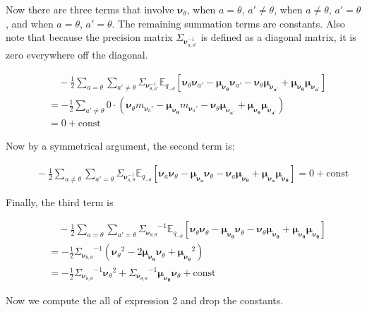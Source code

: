 \documentclass[letterpaper,12pt]{article}
\newcommand{\lp}{\left (} %
\newcommand{\rp}{\right )} %
\newcommand{\lb}{\left [} %
\newcommand{\rb}{\right ]} %
\newcommand{\nuv}{\boldsymbol{\nu}} %
\newcommand{\Sigmanu}{\Sigma_{\nuv}} %
\newcommand{\nua}{\ensuremath{\nuv_a}} %
\newcommand{\nuaprime}{\ensuremath{\nuv_{a'}}} %
\newcommand{\meananu}{\ensuremath{\boldsymbol{\mu_{\nuv_a}}}} %
\newcommand{\meanaprimenu}{\ensuremath{\boldsymbol{\mu_{\nuv_{a'}}}}} %
\newcommand{\nutheta}{\ensuremath{\nuv_\theta}} %
\newcommand{\meannutheta}{\ensuremath{\boldsymbol{\mu_{\nuv_\theta}}}} %
\newcommand{\sigmanutheta}{\ensuremath{\Sigma_{\nuv_{\theta, \theta}}}}
\newcommand{\mnusub}[1]{\ensuremath{m_{\nuv_#1}}} %
\newcommand{\Etheta}{\ensuremath{\mathbb{E}_{q_{-\theta}}}} %
\begin{document}
Now there are three terms that involve $\nutheta$, when $a=\theta$, $a' \neq \theta$, when $a \neq \theta$, $a' = \theta$, and when $a=\theta$, $a'=\theta$. The remaining summation terms are constants. Also note that because the precision matrix $\Sigmanu_{a,a'}^{-1}$ is defined as a diagonal matrix, it is zero everywhere off the diagonal.

\begin{equation}
\begin{split}
    & \quad - \frac{1}{2} \sum_{a=\theta} \sum_{a' \neq \theta}  \Sigmanu_{\theta,a'}^{-1} \Etheta  \lb \nutheta \nuaprime - \meannutheta \nuaprime - \nutheta \meanaprimenu + \meannutheta \meanaprimenu \rb \\
    &= - \frac{1}{2} \sum_{a' \neq \theta} 0 \cdot  \lp \nutheta \mnusub{a'} - \meannutheta \mnusub{a'} - \nutheta \meanaprimenu + \meannutheta \meanaprimenu \rp \\
    &= 0 + \textrm{const}
\end{split}
\end{equation}

Now by a symmetrical argument, the second term is:

\begin{equation}
\begin{split}
    & \quad - \frac{1}{2} \sum_{a \neq \theta} \sum_{a' = \theta}  \Sigmanu_{a,\theta}^{-1} \Etheta  \lb \nua \nutheta - \meananu\nutheta - \nua \meannutheta + \meananu \meannutheta \rb = 0 + \textrm{const}
\end{split}
\end{equation}

Finally, the third term is

\begin{equation}
\begin{split}
    & \quad - \frac{1}{2} \sum_{a=\theta} \sum_{a' = \theta}  \sigmanutheta^{-1} \Etheta  \lb \nutheta \nutheta - \meannutheta \nutheta - \nutheta \meannutheta + \meannutheta \meannutheta \rb \\
    &=  - \frac{1}{2}  \sigmanutheta^{-1} \lp \nutheta^2 - 2 \meannutheta \nutheta + \meannutheta^2 \rp \\
    &= - \frac{1}{2}  \sigmanutheta^{-1} \nutheta^2 + \sigmanutheta^{-1} \meannutheta \nutheta + \text{const}
\end{split}
\end{equation}

Now we compute the all of expression 2 and drop the constants.
\end{document}

